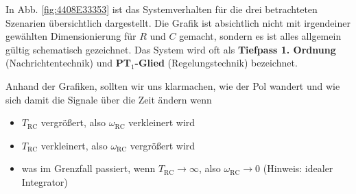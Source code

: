 \documentclass[11pt,a4paper,DIV=12]{scrartcl}
\numberwithin{equation}{section}
\numberwithin{figure}{section}
\newcommand{\fig}[1]{Abb. \ref{#1}} %
\begin{document}
\begin{Loesung}
\begin{itemize}
In \fig{fig:4408E33353} ist das Systemverhalten für die drei betrachteten Szenarien
übersichtlich dargestellt.
%
Die Grafik ist absichtlich nicht mit irgendeiner gewählten Dimensionierung
für $R$ und $C$ gemacht, sondern es ist alles allgemein gültig schematisch gezeichnet.
Das System wird oft als \textbf{Tiefpass 1. Ordnung} (Nachrichtentechnik) und
\textbf{PT$_1$-Glied} (Regelungstechnik) bezeichnet.

Anhand der Grafiken, sollten wir uns klarmachen, wie der Pol wandert und
wie sich damit die Signale über die Zeit ändern
wenn
\begin{itemize}
  \item $T_\mathrm{RC}$ vergrößert, also $\omega_\mathrm{RC}$ verkleinert wird
  \item $T_\mathrm{RC}$ verkleinert, also $\omega_\mathrm{RC}$ vergrößert wird
  \item was im Grenzfall passiert, wenn $T_\mathrm{RC}\to\infty$, also
  $\omega_\mathrm{RC}\to 0$ (Hinweis: idealer Integrator)
\end{itemize}


\end{itemize}
\end{Loesung}
\end{document}
